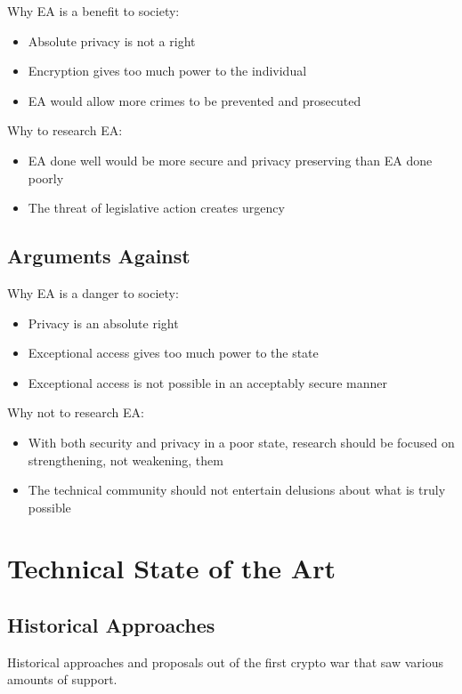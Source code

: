 Why EA is a benefit to society:
\begin{itemize}
    \item Absolute privacy is not a right
    \item Encryption gives too much power to the individual
    \item EA would allow more crimes to be prevented and prosecuted
\end{itemize}

Why to research EA:
\begin{itemize}
    \item EA done well would be more secure and privacy preserving than EA done poorly
    \item The threat of legislative action creates urgency
\end{itemize}

\subsection{Arguments Against}

Why EA is a danger to society:
\begin{itemize}
    \item Privacy is an absolute right
    \item Exceptional access gives too much power to the state
    \item Exceptional access is not possible in an acceptably secure manner
\end{itemize}

Why not to research EA:
\begin{itemize}
    \item With both security and privacy in a poor state, research should be focused on strengthening, not weakening,
            them
    \item The technical community should not entertain delusions about what is truly possible
\end{itemize}

\section{Technical State of the Art}

\subsection{Historical Approaches}

Historical approaches and proposals out of the first crypto war that saw various amounts of support.

